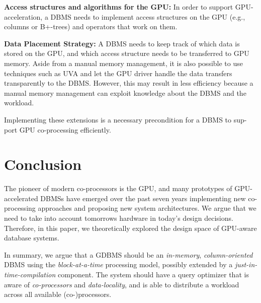 \documentclass[twocolumn]{article}
\begin{document}
\noindent
\textbf{Access structures and algorithms for the GPU:} In order to support GPU- acceleration, a DBMS needs to implement access structures on the GPU (e.g., columns or B+-trees) and operators that work on them. 

\noindent
\textbf{Data Placement Strategy:} A DBMS needs to keep track of which data is stored on the GPU, and which access structure needs to be transferred to GPU memory. Aside from a manual memory management, it is also possible to use techniques such as UVA and let the GPU driver handle the data transfers transparently to the DBMS. However, this may result in less efficiency because a manual memory management can exploit knowledge about the DBMS and the workload.

Implementing these extensions is a necessary precondition for a DBMS to sup- port GPU co-processing efficiently.



\section{Conclusion}
The pioneer of modern co-processors is the GPU, and many prototypes of GPU-accelerated DBMSs have emerged over the past seven years implementing new co-processing approaches and proposing new system architectures. We argue that we need to take into account tomorrows hardware in today's design decisions. Therefore, in this paper, we theoretically explored the design space of GPU-aware database systems. 

In summary, we argue that a GDBMS should be an \textit{in-memory}, \textit{column-oriented} DBMS using the \textit{block-at-a-time} processing model, possibly extended by a \textit{just-in-time-compilation} component. The system should have a query optimizer that is aware of \textit{co-processors} and \textit{data-locality}, and is able to distribute a workload across all available (co-)processors.





























\end{document}
